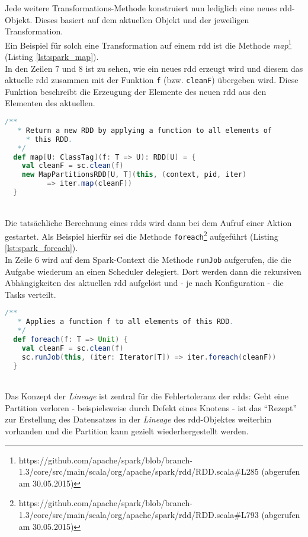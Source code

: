 Jede weitere Transformations-Methode konstruiert nun lediglich eine neues \gls{rdd}-Objekt. Dieses basiert auf dem aktuellen Objekt und der jeweiligen Transformation.\\

Ein Beispiel für solch eine Transformation auf einem \gls{rdd} ist die Methode \textit{map}\footnote{https://github.com/apache/spark/blob/branch-1.3/core/src/main/scala/org/apache/spark/rdd/RDD.scala#L285 (abgerufen am 30.05.2015)} (Listing \ref{lst:spark_map}).\\

In den Zeilen 7 und 8 ist zu sehen, wie ein neues \gls{rdd} erzeugt wird und diesem das aktuelle \gls{rdd} zusammen mit der Funktion \lstinline|f| (bzw. \lstinline|cleanF|) übergeben wird. Diese Funktion beschreibt die Erzeugung der Elemente des neuen \gls{rdd} aus den Elementen des aktuellen.\\

\begin{lstlisting}[language=Scala,caption={Map-Methode aus org.apache.spark.rdd.RDD v1.3.0},label={lst:spark_map}]
  /**
   * Return a new RDD by applying a function to all elements of 
	 * this RDD.
   */
  def map[U: ClassTag](f: T => U): RDD[U] = {
    val cleanF = sc.clean(f)
    new MapPartitionsRDD[U, T](this, (context, pid, iter) 
		  => iter.map(cleanF))
  }
\end{lstlisting}
\\
Die tatsächliche Berechnung eines \glspl{rdd} wird dann bei dem Aufruf einer Aktion gestartet. Als Beispiel hierfür sei die Methode \lstinline|foreach|\footnote{https://github.com/apache/spark/blob/branch-1.3/core/src/main/scala/org/apache/spark/rdd/RDD.scala#L793 (abgerufen am 30.05.2015)} aufgeführt (Listing \ref{lst:spark_foreach}).\\
In Zeile 6 wird auf dem Spark-Context die Methode \lstinline|runJob| aufgerufen, die die Aufgabe wiederum an einen Scheduler delegiert. Dort werden dann die rekursiven Abhängigkeiten des aktuellen \gls{rdd} aufgelöst und - je nach Konfiguration - die Tasks verteilt.\\

\begin{lstlisting}[language=Scala,caption={foreach-Methode aus org.apache.spark.rdd.RDD v1.3.0},label={lst:spark_foreach}]
  /**
   * Applies a function f to all elements of this RDD.
   */
  def foreach(f: T => Unit) {
    val cleanF = sc.clean(f)
    sc.runJob(this, (iter: Iterator[T]) => iter.foreach(cleanF))
  }
\end{lstlisting}
\\
Das Konzept der \textit{Lineage} ist zentral für die Fehlertoleranz der \gls{rdd}s:
Geht eine Partition verloren - beispielsweise durch Defekt eines Knotens - ist das "`Rezept"' zur Erstellung des Datensatzes in der \textit{Lineage} des \gls{rdd}-Objektes weiterhin vorhanden und die Partition kann gezielt wiederhergestellt werden.\\

